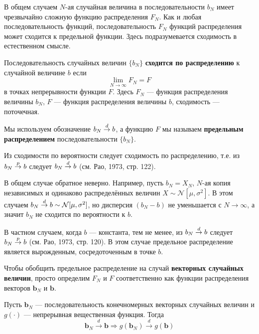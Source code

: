 В общем случаем $N$-ая случайная величина в последовательности $b_N$ имеет чрезвычайно сложную функцию распределения $F_N$. Как и любая последовательность функций, последовательность $F_N$ функций распределения может сходится к предельной функции. Здесь подразумевается сходимость в естественном смысле.

\begin{definition} 
\label{def:A10}
Последовательность случайных величин $\{b_N\}$ \textbf{сходится по распределению} к случайной величине $b$ если
\begin{equation}
\label{eq:A9}
\lim_{N\to\infty} F_N = F
\end{equation}
в точках непрерывности функции $F$. Здесь $F_N$ --- функция распределения величины $b_N$, $F$ --- функция распределения величины $b$, сходимость --- поточечная.
\end{definition}

Мы используем обозначение $b_N \overset{d}{\to}b$, а функцию $F$ мы называем \textbf{предельным распределением} последовательности $\{b_N\}$.

Из сходимости по вероятности следует сходимость по распределению, т.е. из $b_N \overset{p}{\to}b$ следует $b_N \overset{d}{\to}b$ (см. Рао, 1973, стр. 122).

В общем случае обратное неверно. Например, пусть $b_N=X_N$, $N$-ая копия независимых и одинаково распределённых величин $X \sim \mathcal{N}[\mu,\sigma^2]$. В этом случаем $b_N \overset{d}{\to}b\sim \mathcal{N}[\mu,\sigma^2]$, но дисперсия $(b_N-b)$ не уменьшается с $N\to \infty$, а значит $b_N$ не сходится по вероятности к $b$.

В частном случаем, когда $b$ --- константа, тем не менее, из $b_N \overset{d}{\to}b$ следует $b_N \overset{p}{\to}b$ (см. Рао, 1973, стр. 120). В этом случае предельное распределение является вырожденным, сосредоточенным в точке $b$.

Чтобы обобщить предельное распределение на случай \textbf{векторных случайных величин}, просто определим $F_N$ и $F$ соответственно как функции распределения векторов $\mathbf{b}_N$ и $\mathbf{b}$.

\begin{theorem}
\label{th:A11}
Пусть $\mathbf{b}_N$ --- последовательность конечномерных векторных случайных величин и $g(\cdot)$ --- непрерывная вещественная функция. Тогда
\begin{equation}
\mathbf{b}_N \overset{d}{\to} \mathbf{b} \Rightarrow g(\mathbf{b}_N) \overset{d}{\to} g(\mathbf{b})
\end{equation}
\end{theorem}

